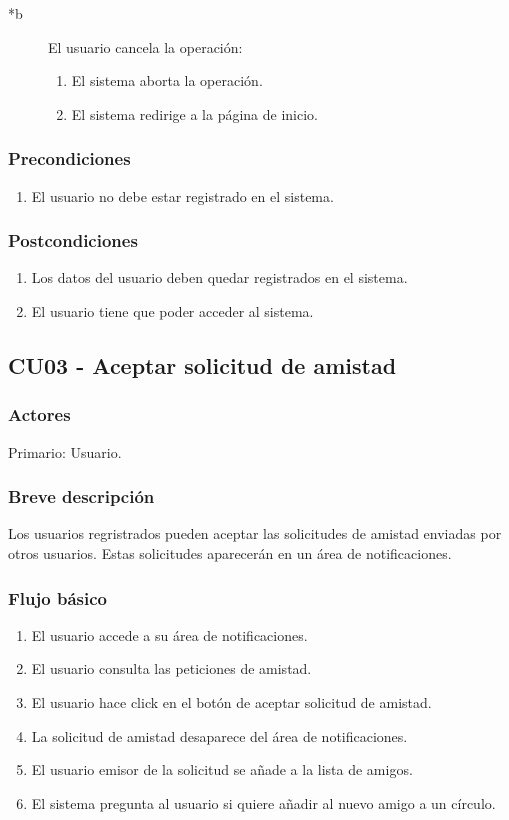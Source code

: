\documentclass[12pt, a4paper, titlepage]{article}
\begin{document}
\begin{description}
	\item [*b] El usuario cancela la operación:
	\begin{enumerate}
		\item El sistema aborta la operación.
		\item El sistema redirige a la página de inicio.
	\end{enumerate}
\end{description}

\subsubsection{Precondiciones}
\begin{enumerate}
	\item El usuario no debe estar registrado en el sistema.
\end{enumerate}
\subsubsection{Postcondiciones}
\begin{enumerate}
	\item Los datos del usuario deben quedar registrados en el sistema.
	\item El usuario tiene que poder acceder al sistema.
\end{enumerate}


\subsection{CU03 - Aceptar solicitud de amistad}
\subsubsection{Actores}
Primario: Usuario.
\subsubsection{Breve descripción}
Los usuarios regristrados pueden aceptar las solicitudes de amistad enviadas por otros usuarios. Estas solicitudes aparecerán en un área de notificaciones.
\subsubsection{Flujo básico}
\begin{enumerate}
	\item El usuario accede a su área de notificaciones.
	\item El usuario consulta las peticiones de amistad.
	\item El usuario hace click en el botón de aceptar solicitud de amistad.
	\item La solicitud de amistad desaparece del área de notificaciones.
	\item El usuario emisor de la solicitud se añade a la lista de amigos.
	\item El sistema pregunta al usuario si quiere añadir al nuevo amigo a un círculo.
\end{enumerate}
\end{document}
